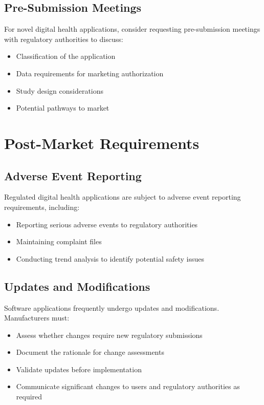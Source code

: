 \subsection{Pre-Submission Meetings}
For novel digital health applications, consider requesting pre-submission meetings with regulatory authorities to discuss:

\begin{itemize}
    \item Classification of the application
    \item Data requirements for marketing authorization
    \item Study design considerations
    \item Potential pathways to market
\end{itemize}

\section{Post-Market Requirements}
\subsection{Adverse Event Reporting}
Regulated digital health applications are subject to adverse event reporting requirements, including:

\begin{itemize}
    \item Reporting serious adverse events to regulatory authorities
    \item Maintaining complaint files
    \item Conducting trend analysis to identify potential safety issues
\end{itemize}

\subsection{Updates and Modifications}
Software applications frequently undergo updates and modifications. Manufacturers must:

\begin{itemize}
    \item Assess whether changes require new regulatory submissions
    \item Document the rationale for change assessments
    \item Validate updates before implementation
    \item Communicate significant changes to users and regulatory authorities as required
\end{itemize}

